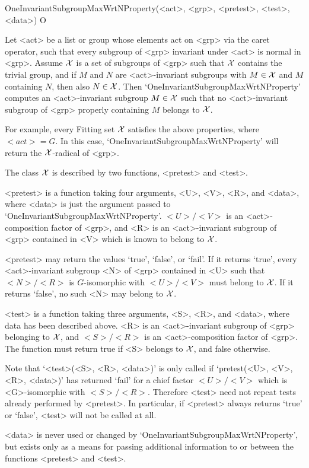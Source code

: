 \>OneInvariantSubgroupMaxWrtNProperty(<act>, <grp>, <pretest>, <test>, <data>) O

Let <act> be a list or group whose elements act on <grp> via the caret operator,
such that every subgroup of <grp> invariant under <act> is normal in <grp>. 
Assume $\cal X$ is a set of subgroups of <grp>  such that $\cal X$ contains the trivial group,
and if $M$ and $N$ are <act>-invariant subgroups with $M \in \cal X$ and $M$ containing $N$,
then also $N \in \cal X$. Then 
`OneInvariantSubgroupMaxWrtNProperty' computes an <act>-invariant subgroup $M \in
\cal X$ such that no <act>-invariant subgroup of <grp> properly containing $M$ belongs to $\cal
X$. 

For example, every Fitting set $\cal X$ satisfies the above properties, where $<act> = G$. In
this case, `OneInvariantSubgroupMaxWrtNProperty' will return the $\cal
X$-radical of <grp>.

The class $\cal X$ is described by two functions, <pretest> and <test>. 

<pretest> is a function taking four arguments, <U>, <V>, <R>, and <data>,
where <data> is just the argument passed to
`OneInvariantSubgroupMaxWrtNProperty'. $<U>/<V>$ is an <act>-composition factor of
<grp>, and  <R> is an <act>-invariant subgroup of <grp> contained in <V> which is known to
belong to
$\cal X$.

<pretest> may return the values `true', `false', or `fail'. If it returns 
`true', every <act>-invariant subgroup <N> of <grp> contained in <U> such that
$<N>/<R>$ is 
$G$-isomorphic with $<U>/<V>$ must belong to $\cal X$. If it returns `false',
no such <N> may belong to $\cal X$. 

<test> is a function taking three arguments, <S>, <R>, and <data>, where
data has been described above. <R> is an <act>-invariant subgroup of <grp> belonging to
$\cal X$, and $<S>/<R>$ is an <act>-composition factor of <grp>. The function must return
true if <S> belongs to $\cal X$, and false otherwise. 

Note that `<test>(<S>, <R>, <data>)' is only called if `pretest(<U>, <V>,
<R>, <data>)' has returned `fail' for a chief factor $<U>/<V>$ which is
<G>-isomorphic with $<S>/<R>$. Therefore <test> need not repeat tests
already performed by <pretest>. In particular, if <pretest> always returns
`true' or `false', <test> will not be called at all.

<data> is never used or changed by `OneInvariantSubgroupMaxWrtNProperty', but
exists only as a means for passing additional information to or between
the functions <pretest> and <test>.


